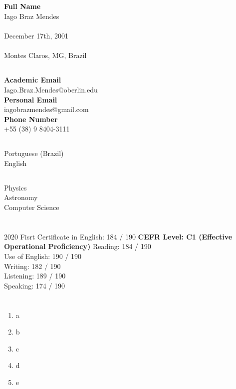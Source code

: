 \documentclass{cv}
\begin{document}
    \firstsection
        {
            \subsection*{}
                \textbf{Full Name} \\ Iago Braz Mendes \\
                \faCalendar \\ December 17th, 2001 \\
                \faHome \\ Montes Claros, MG, Brazil
        }
        {
            \subsection*{}
                \textbf{Academic Email} \\ {\footnotesize Iago.Braz.Mendes@oberlin.edu} \\
                \textbf{Personal Email} \\ {\footnotesize iagobrazmendes@gmail.com} \\
                \textbf{Phone Number} \\ +55 (38) 9 8404-3111
        }
        {
            \subsection*{}
                Portuguese (Brazil) \\ English
        }
        {
            \subsection*{}
                Physics \\ Astronomy \\ Computer Science
        }
    \section*{}
        \begin{entrylist}
            \entry
                {2020}
                {Fisrt Certificate in English: 184 / 190}
                {\textbf{CEFR Level: C1 (Effective Operational     Proficiency)}}
                {Reading: 184 / 190\\ Use of English: 190 / 190\\ Writing: 182 / 190\\ Listening: 189 / 190\\ Speaking: 174 / 190}
        \end{entrylist}
    \section*{}
        \begin{enumerate}
            \item a
            \item b
            \item c
            \item d
            \item e
        \end{enumerate}
\end{document}
